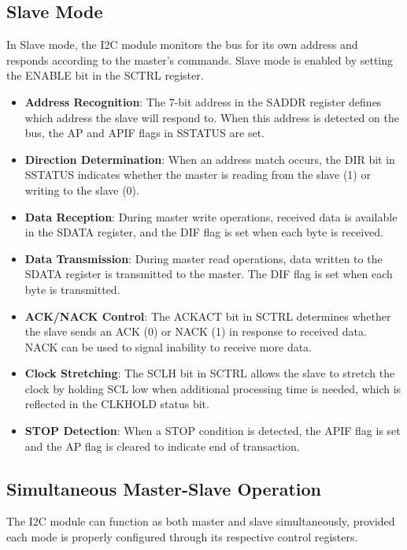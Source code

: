 \subsection{Slave Mode}
In Slave mode, the I2C module monitors the bus for its own address and responds according to the master's commands. Slave mode is enabled by setting the ENABLE bit in the SCTRL register.

\begin{itemize}
    \item \textbf{Address Recognition}: The 7-bit address in the SADDR register defines which address the slave will respond to. When this address is detected on the bus, the AP and APIF flags in SSTATUS are set.
    
    \item \textbf{Direction Determination}: When an address match occurs, the DIR bit in SSTATUS indicates whether the master is reading from the slave (1) or writing to the slave (0).
    
    \item \textbf{Data Reception}: During master write operations, received data is available in the SDATA register, and the DIF flag is set when each byte is received.
    
    \item \textbf{Data Transmission}: During master read operations, data written to the SDATA register is transmitted to the master. The DIF flag is set when each byte is transmitted.
    
    \item \textbf{ACK/NACK Control}: The ACKACT bit in SCTRL determines whether the slave sends an ACK (0) or NACK (1) in response to received data. NACK can be used to signal inability to receive more data.
    
    \item \textbf{Clock Stretching}: The SCLH bit in SCTRL allows the slave to stretch the clock by holding SCL low when additional processing time is needed, which is reflected in the CLKHOLD status bit.
    
    \item \textbf{STOP Detection}: When a STOP condition is detected, the APIF flag is set and the AP flag is cleared to indicate end of transaction.
\end{itemize}

\subsection{Simultaneous Master-Slave Operation}
The I2C module can function as both master and slave simultaneously, provided each mode is properly configured through its respective control registers.

